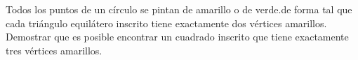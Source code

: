 \begin{problem}
	Todos los puntos de un círculo se pintan de amarillo o de verde.de forma tal que cada triángulo equilátero inscrito tiene exactamente dos vértices amarillos. Demostrar que es posible encontrar un cuadrado inscrito que tiene exactamente tres vértices amarillos.
\end{problem}